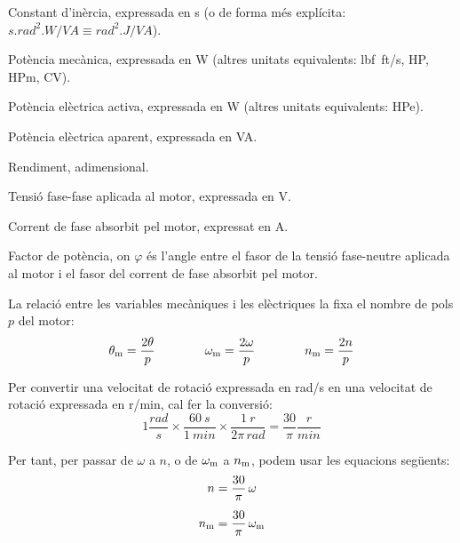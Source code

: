 \begin{list}{}
   \item[$H$] Constant d'inèrcia, expressada en \unit{s} (o de forma més explícita:
   $\unit{s.rad^2.W/VA} \equiv \unit{rad^2.J/VA}$).
   \item[$P\ped{m}$] Potència mecànica, expressada en \unit{W} (altres unitats equivalents: \unit{lbf.ft/s}, \unit{HP},  \unit{HPm}, \unit{CV}).
   \item[$P$] Potència elèctrica activa, expressada en \unit{W} (altres unitats equivalents: \unit{HPe}).
   \item[$S$] Potència elèctrica aparent, expressada en \unit{VA}.
   \item[$\eta$] Rendiment, adimensional.
   \item[$U$] Tensió fase-fase aplicada al motor, expressada en \unit{V}.
   \item[$I$] Corrent de fase absorbit pel motor, expressat en \unit{A}.
   \item[$\cos\varphi$] Factor de potència, on $\varphi$ és l'angle entre el fasor de la tensió fase-neutre aplicada al motor i el fasor del corrent de fase absorbit pel motor.
\end{list}

La relació entre les variables mecàniques i les elèctriques la fixa el nombre de pols $p$ del motor:
\begin{equation}\label{eq:vel-ele-mec}
    \theta_\mathrm{m} = \frac{2\theta}{p} \qquad\qquad
    \omega_\mathrm{m} = \frac{2\omega}{p} \qquad\qquad
    n_\mathrm{m} = \frac{2n}{p}
\end{equation}

Per  convertir una velocitat de rotació expressada en \unit{rad/s} en una velocitat de rotació expressada en \unit{r/min}, cal fer la conversió:
\begin{equation}
 1\frac{\unit{rad}}{\unit{s}} \times \frac{\qty{60}{s}}{\qty{1}{min}} \times \frac{\qty{1}{r}}{2\pi\,\unit{rad}} = \frac{30}{\pi}\frac{\unit{r}}{\unit{min}}
 \end{equation}

 Per tant, per passar de $\omega$ a $n$, o de $\omega_\mathrm{m}$ a $n_\mathrm{m}$, podem usar les equacions següents:
\begin{subequations}\index{motors d'inducció!velocitat}
\begin{align}
    n        &= \frac{30}{\pi} \,\omega \\[1ex]
    n\ped{m} &= \frac{30}{\pi} \,\omega\ped{m}
\end{align}
\end{subequations}

